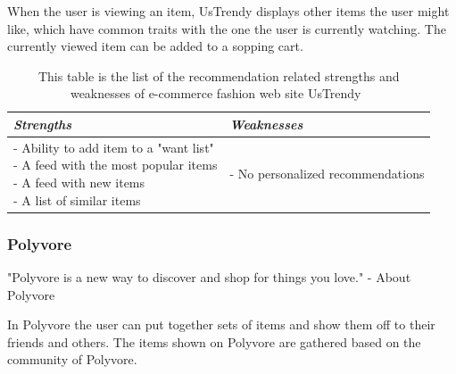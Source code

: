     When the user is viewing an item, UsTrendy displays other items the user might like, which have common traits with the one the user is currently watching.
    The currently viewed item can be added to a sopping cart.
    \begin{table}[H]
        \centering
        \begin{tabular}{l|l}
            \toprule
            \emph{Strengths} & \emph{Weaknesses} \\ \hline
            \pbox{9cm}{
                - Ability to add item to a "want list" \\
                - A feed with the most popular items \\
                - A feed with new items \\
                - A list of similar items
            } & \pbox{9cm}{
                - No personalized recommendations \\
            } \\ \bottomrule
        \end{tabular}
        \caption[Recommendation related strengths and weaknesses of UsTrendy~\cite{UsTrendy}]{This table is the list of the recommendation related strengths and weaknesses of e-commerce fashion web site UsTrendy~\cite{UsTrendy}}
        \label{table:ecommenreceUsTrendy}
    \end{table}


\subsubsection{Polyvore} %
\label{par:polyvore}
    "Polyvore is a new way to discover and shop for things you love." - About Polyvore~\cite{polyvore}

    In Polyvore the user can put together sets of items and show them off to their friends and others.
    The items shown on Polyvore are gathered based on the community of Polyvore.

